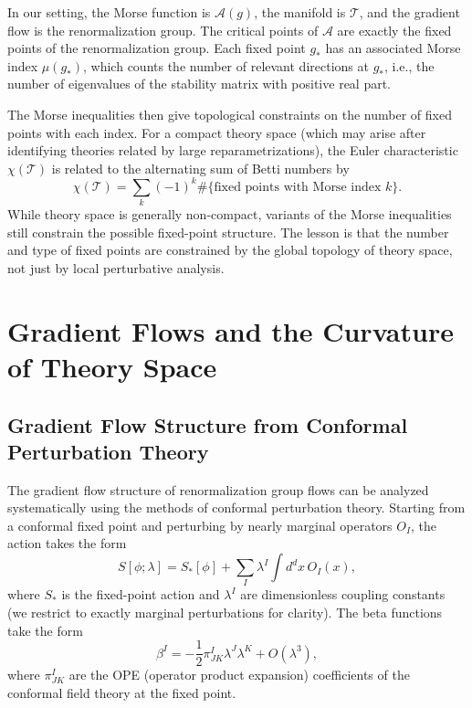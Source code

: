\documentclass[11pt, twoside, openright]{book}
\theoremstyle{dotted}
\theoremstyle{definition}
\newcommand{\cT}{\mathcal{T}}          %
\begin{document}
In our setting, the Morse function is $\mathcal{A}(g)$, the manifold is $\cT$,
and the gradient flow is the renormalization group. The critical points of
$\mathcal{A}$ are exactly the fixed points of the renormalization group. Each
fixed point $g_*$ has an associated Morse index $\mu(g_*)$, which counts the number
of relevant directions at $g_*$, i.e., the number of eigenvalues of the stability
matrix with positive real part.

The Morse inequalities then give topological constraints on the number of fixed
points with each index. For a compact theory space (which may arise after
identifying theories related by large reparametrizations), the Euler characteristic
$\chi(\cT)$ is related to the alternating sum of Betti numbers by
\begin{equation}
  \chi(\cT) = \sum_k (-1)^k \#\{\text{fixed points with Morse index }k\}.
  \label{eq:morse_euler}
\end{equation}
While theory space is generally non-compact, variants of the Morse inequalities
still constrain the possible fixed-point structure. The lesson is that the number
and type of fixed points are constrained by the global topology of theory space,
not just by local perturbative analysis.

\chapter{Gradient Flows and the Curvature of Theory Space}
\label{ch:gradient_curvature}

\section{Gradient Flow Structure from Conformal Perturbation Theory}

The gradient flow structure of renormalization group flows can be analyzed
systematically using the methods of conformal perturbation theory. Starting from
a conformal fixed point and perturbing by nearly marginal operators $O_I$, the
action takes the form
\begin{equation}
  S[\phi; \lambda] = S_*[\phi] + \sum_I \lambda^I \int d^dx \, O_I(x),
  \label{eq:cpt_action}
\end{equation}
where $S_*$ is the fixed-point action and $\lambda^I$ are dimensionless coupling
constants (we restrict to exactly marginal perturbations for clarity). The beta
functions take the form
\begin{equation}
  \beta^I = -\frac{1}{2}\pi_{JK}^I \lambda^J\lambda^K + O(\lambda^3),
  \label{eq:cpt_beta}
\end{equation}
where $\pi_{JK}^I$ are the OPE (operator product expansion) coefficients of the
conformal field theory at the fixed point.
\end{document}
